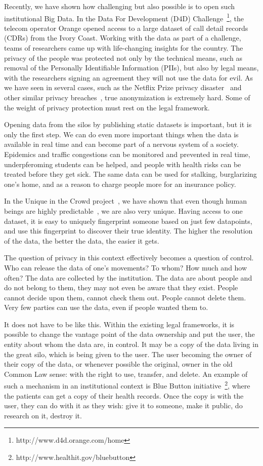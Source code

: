 Recently, we have shown how challenging but also possible is to open such institutional Big Data.
In the Data For Development (D4D) Challenge~\footnote{http://www.d4d.orange.com/home}, the telecom operator Orange opened access to a large dataset of call detail records (CDRs) from the Ivory Coast.
Working with the data as part of a challenge, teams of researchers came up with life-changing insights for the country. 
The privacy of the people was protected not only by the technical means, such as removal of the Personally Identifiable Information (PIIs), but also by legal means, with the researchers signing an agreement they will not use the data for evil.
As we have seen in several cases, such as the Netflix Prize privacy disaster~\cite{narayanan2008robust} and other similar privacy breaches~\cite{sweeney2000simple}, true anonymization is extremely hard.  Some of the weight of privacy protection must rest on the legal framework.

Opening data from the silos by publishing static datasets is important, but it is only the first step. 
We can do even more important things when the data is available in real time and can become part of a nervous system of a society.
Epidemics and traffic congestions can be monitored and prevented in real time, underpferoming students can be helped, and people with health risks can be treated before they get sick.
The same data can be used for stalking, burglarizing one's home, and as a reason to charge people more for an insurance policy.

In the Unique in the Crowd project~\cite{de2013unique}, we have shown that even though human beings are highly predictable~\cite{song2010limits}, we are also very unique.
Having access to one dataset, it is easy to uniquely fingerprint someone based on just few datapoints, and use this fingerprint to discover their true identity. 
The higher the resolution of the data, the better the data, the easier it gets.

The question of privacy in this context effectively becomes a question of control. 
Who can release the data of one's movements?
To whom? 
How much and how often?
The data are collected by the institution.
The data are about people and do not belong to them, they may not even be aware that they exist.
People cannot decide upon them, cannot check them out.
People cannot delete them.
Very few parties can use the data, even if people wanted them to.

It does not have to be like this.
Within the existing legal frameworks, it is possible to change the vantage point of the data ownership and put the user, the entity about whom the data are, in control.
It may be a copy of the data living in the great silo, which is being given to the user.
The user becoming the owner of their copy of the data, or whenever possible the original, owner in the old Common Law sense: with the right to use, transfer, and delete. 
An example of such a mechanism in an institutional context is Blue Button initiative~\footnote{http://www.healthit.gov/bluebutton}, where the patients can get a copy of their health records.
Once the copy is with the user, they can do with it as they wish: give it to someone, make it public, do research on it, destroy it.


